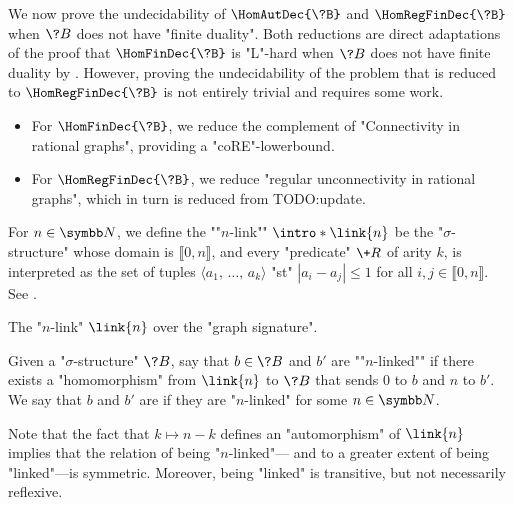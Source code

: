 We now prove the undecidability of $\HomAutDec{\?B}$ and $\HomRegFinDec{\?B}$
when $\?B$ does not have "finite duality". Both reductions are
direct adaptations of the proof that $\HomFinDec{\?B}$ is "L"-hard when $\?B$ does not
have finite duality by \textcite[Theorem 3.2]{LaroseTesson2009UniversalAlgebraCSP}.
However, proving the undecidability of the problem that is reduced
to $\HomRegFinDec{\?B}$ is not entirely trivial and requires some work.
\begin{itemize}
	\item For $\HomFinDec{\?B}$, we reduce the complement of "Connectivity in rational graphs",
		providing a "coRE"-lowerbound.
	\item For $\HomRegFinDec{\?B}$, we reduce "regular unconnectivity in rational graphs",
		which in turn is reduced from  TODO:update.
\end{itemize}

For $n\in\N$, we define the \AP""$n$-link"" $\intro*\link{n}$ be the "$\sigma$-structure" 
whose domain is $\lBrack 0,n\rBrack$, and every "predicate" $\+R$
of arity $k$, is interpreted as the set of tuples $\langle a_1,\, \hdots,\, a_k \rangle$
"st" $|a_i-a_j| \leq 1$ for all $i,j \in \lBrack 0,n \rBrack$. See .
\begin{marginfigure}
	\centering
	\begin{tikzpicture}
		
	\end{tikzpicture}
	\caption{\AP\label{fig:n-link}The "$n$-link" $\link{n}$ over the "graph signature".}
\end{marginfigure}
Given a "$\sigma$-structure" $\?B$, say that $b \in \?B$ and $b'$ are
\AP""$n$-linked"" if there exists a "homomorphism" from $\link{n}$ to $\?B$
that sends $0$ to $b$ and $n$ to $b'$. We say that $b$ and $b'$ are \AP{} if
they are "$n$-linked" for some $n \in \N$.

Note that the fact that $k \mapsto n-k$
defines an "automorphism" of $\link{n}$ implies that the relation of being "$n$-linked"---%
and to a greater extent of being "linked"---is symmetric.
Moreover, being "linked" is transitive, but not necessarily reflexive.

